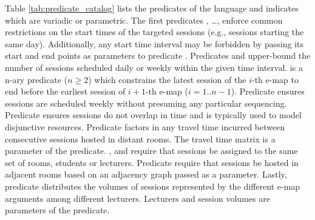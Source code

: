 Table \ref{tab:predicate_catalog} lists the predicates of the language
and indicates which are variadic or parametric.
The first predicates 
\texttt{\SAMEDAILYSLOT},
\ldots,
\texttt{\SAMESLOT}
enforce common restrictions on the start times of the targeted sessions (e.g., sessions starting the same day).
Additionally,
any start time interval may be forbidden 
by passing its start and end points 
as parameters to 
predicate \texttt{\FORBIDDENPERIOD}.
Predicates \texttt{\ATMOSTDAILY}
and
\texttt{\ATMOSTWEEKLY}
upper-bound
the number of sessions
scheduled daily or weekly
within the given time interval.
\texttt{\SEQUENCED}
is a n-ary predicate ($n\geq2$)
which constrains
the latest session of the $i$-th e-map 
to end before
the earliest session of $i+1$-th e-map ($i=1..n-1$).
Predicate 
\texttt{\WEEKLY}
ensures sessions
are scheduled weekly
without presuming any particular sequencing.
Predicate
\texttt{\NOOVERLAP}
ensures sessions do not overlap in time
and is typically used to model disjunctive resources.
Predicate \texttt{\TRAVEL}
factors in any travel time
incurred between consecutive sessions
hosted in distant rooms.
The travel time matrix is a parameter of the predicate.
\texttt{\SAMEROOMS},
\texttt{\SAMESTUDENTS}
and
\texttt{\SAMETEACHERS}
require that sessions be assigned to the same set of rooms,
students or lecturers.
Predicate 
\texttt{\ADJACENTROOMS}
require that sessions be hosted in 
adjacent rooms 
based on an adjacency graph passed as a parameter.
Lastly, 
predicate \texttt{\TEACHERDISTRIBUTION}
distributes the volumes of sessions represented by the different e-map arguments 
among different lecturers. Lecturers and session volumes are parameters of the predicate.

